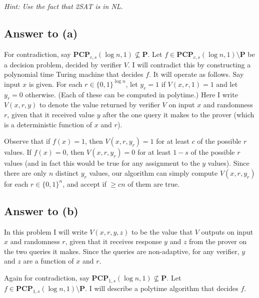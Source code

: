 \documentclass{article}
\renewcommand{\P}{\mathbf{P}}
\begin{document}
\smallskip

\emph{Hint: Use the fact that 2SAT is in NL.} 

\newpage
\subsection*{Answer to (a)}
For contradiction, say $\mathbf{PCP}_{c, s}(\log n, 1) \not\subseteq \P$.
Let $f \in \mathbf{PCP}_{c, s}(\log n, 1) \setminus \P$ be a decision problem,
decided by verifier $V$.
I will contradict this by constructing a polynomial time Turing machine that decides $f$.
It will operate as follows.  Say input $x$ is given.
For each $r \in \{0, 1\}^{\log n}$, let $y_r = 1$ if $V(x, r, 1) = 1$ and let $y_r = 0$ otherwise. (Each of these can be computed in polytime.) Here I write $V(x, r, y)$ to denote the value returned by verifier $V$ on input $x$ and randomness $r$, given that it received value $y$ after the one query it makes to the prover (which is a deterministic function of $x$ and $r$).

Observe that if $f(x) = 1$, then $V(x, r, y_r) = 1$ for at least $c$ of the possible $r$ values.
If $f(x) = 0$, then $V(x, r, y_r) = 0$ for at least $1 - s$ of the possible $r$ values (and in fact this would be true for any assignment to the $y$ values).
Since there are only $n$ distinct $y_r$ values, our algorithm can simply compute $V(x, r, y_r)$ for each $r \in \{0, 1\}^n$, and accept if $\geq cn$ of them are true.

\subsection*{Answer to (b)}
In this problem I will write $V(x, r, y, z)$ to be the value that $V$ outputs on input $x$ and randomness $r$, given that it receives response $y$ and $z$ from the prover on the two queries it makes.  Since the queries are non-adaptive, for any verifier, $y$ and $z$ are a function of $x$ and $r$.

Again for contradiction, say $\mathbf{PCP}_{1, s}(\log n, 1) \not\subseteq \P$.
Let $f \in \mathbf{PCP}_{1, s}(\log n, 1) \setminus \P$.
I will describe a polytime algorithm that decides $f$.
\end{document}
